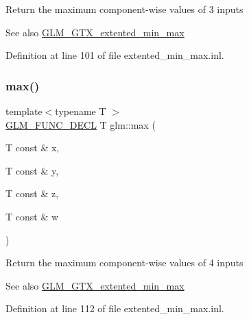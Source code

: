 Return the maximum component-\/wise values of 3 inputs \begin{DoxySeeAlso}{See also}
\hyperlink{group__gtx__extented__min__max}{G\+L\+M\+\_\+\+G\+T\+X\+\_\+extented\+\_\+min\+\_\+max} 
\end{DoxySeeAlso}


Definition at line 101 of file extented\+\_\+min\+\_\+max.\+inl.

\mbox{\label{group__gtx__extented__min__max_ga78e04a0cef1c4863fcae1a2130500d87}} 
\subsubsection{\texorpdfstring{max()}{max()}\hspace{0.1cm}{\footnotesize\ttfamily [4/6]}}
{\footnotesize\ttfamily template$<$typename T $>$ \\
\hyperlink{setup_8hpp_ab2d052de21a70539923e9bcbf6e83a51}{G\+L\+M\+\_\+\+F\+U\+N\+C\+\_\+\+D\+E\+CL} T glm\+::max (\begin{DoxyParamCaption}\item[{T const \&}]{x,  }\item[{T const \&}]{y,  }\item[{T const \&}]{z,  }\item[{T const \&}]{w }\end{DoxyParamCaption})}

Return the maximum component-\/wise values of 4 inputs \begin{DoxySeeAlso}{See also}
\hyperlink{group__gtx__extented__min__max}{G\+L\+M\+\_\+\+G\+T\+X\+\_\+extented\+\_\+min\+\_\+max} 
\end{DoxySeeAlso}


Definition at line 112 of file extented\+\_\+min\+\_\+max.\+inl.

\mbox{\label{group__gtx__extented__min__max_ga7cca8b53cfda402040494cdf40fbdf4a}} 
